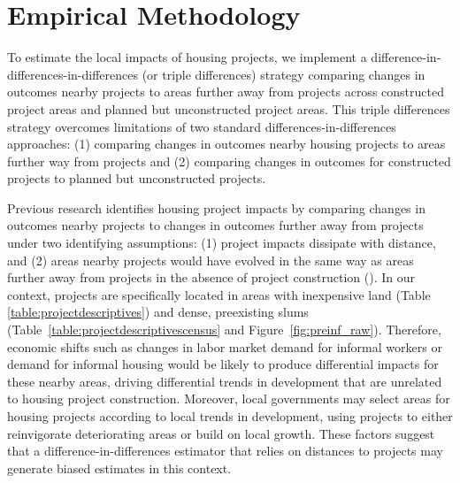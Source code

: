 \documentclass[12pt]{article}
\begin{document}
\section{Empirical Methodology}\label{section:methodology}


To estimate the local impacts of housing projects, we implement a difference-in-differences-in-differences (or triple differences) strategy comparing changes in outcomes nearby projects to areas further away from projects across constructed project areas and planned but unconstructed project areas.  This triple differences strategy overcomes limitations of two standard differences-in-differences approaches: (1) comparing changes in outcomes nearby housing projects to areas further way from projects and (2) comparing changes in outcomes for constructed projects to planned but unconstructed projects.

Previous research identifies housing project impacts by comparing changes in outcomes nearby projects to changes in outcomes further away from projects under two identifying assumptions: (1) project impacts dissipate with distance, and (2) areas nearby projects would have evolved in the same way as areas further away from projects in the absence of project construction (\cite{diamond2016wants,harari2018slum}).  In our context, projects are specifically located in areas with inexpensive land (Table \ref{table:projectdescriptives}) and dense, preexisting slums (Table~\ref{table:projectdescriptivescensus} and Figure~\ref{fig:preinf_raw}).  Therefore, economic shifts such as changes in labor market demand for informal workers or demand for informal housing would be likely to produce differential impacts for these nearby areas, driving differential trends in development that are unrelated to housing project construction.  Moreover, local governments may select areas for housing projects according to local trends in development, using projects to either reinvigorate deteriorating areas or build on local growth.  These factors suggest that a difference-in-differences estimator that relies on distances to projects may generate biased estimates in this context.
\end{document}
